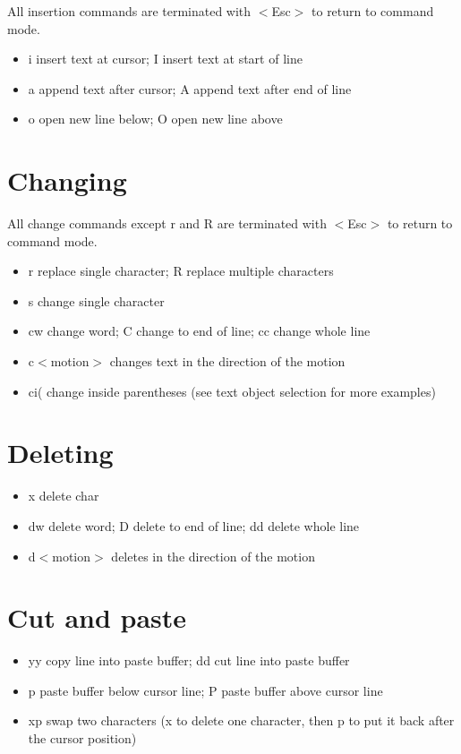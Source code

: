 \documentclass{article}
\begin{document}
All insertion commands are terminated with $<$Esc$>$ to return to command mode.
\begin{itemize}
    \item i insert text at cursor; I insert text at start of line
    \item a append text after cursor; A append text after end of line
    \item o open new line below; O open new line above
    \end{itemize}
\section{Changing}

All change commands except r and R are terminated with $<$Esc$>$ to return to command mode.
\begin{itemize}
    \item r replace single character; R replace multiple characters
    \item s change single character
    \item cw change word; C change to end of line; cc change whole line
    \item c$<$motion$>$ changes text in the direction of the motion
    \item ci( change inside parentheses (see text object selection for more examples)
\end{itemize}

\section{Deleting}
\begin{itemize}
    \item x delete char
    \item dw delete word; D delete to end of line; dd delete whole line
    \item d$<$motion$>$ deletes in the direction of the motion
    \end{itemize}

\section{Cut and paste}
\begin{itemize}
    \item yy copy line into paste buffer; dd cut line into paste buffer
    \item p paste buffer below cursor line; P paste buffer above cursor line
    \item xp swap two characters (x to delete one character, then p to put it back after the cursor position)
    \end{itemize}
\end{document}
